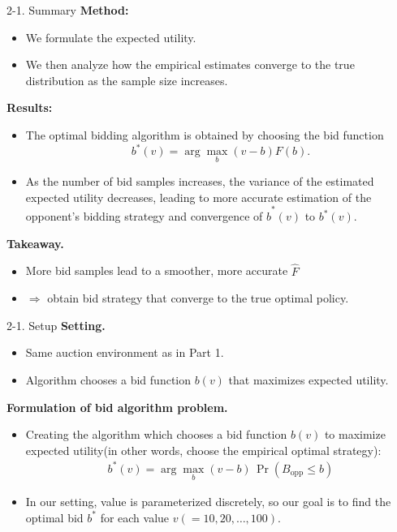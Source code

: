 \documentclass{beamer}
\begin{document}
\begin{frame}{2-1. Summary}
\small
\textbf{Method:}
\begin{itemize}
    \item We formulate the expected utility.
    \item We then analyze how the empirical estimates converge to the true distribution as the sample size increases.
\end{itemize}
\vspace{1em}
\textbf{Results:}
\begin{itemize}
    \item The optimal bidding algorithm is obtained by choosing the bid function
    \[
    b^*(v) = \arg\max_{b}(v-b)F(b).
    \]
    \item As the number of bid samples increases, the variance of the estimated expected utility decreases,
    leading to more accurate estimation of the opponent’s bidding strategy and convergence of $\hat b^*(v)$ to $b^*(v)$.
\end{itemize}
\vspace{1em}
\textbf{Takeaway.}\\
\begin{itemize}
    \item More bid samples lead to a smoother, more accurate $\hat F$\\
    \item $\Rightarrow$ obtain bid strategy that converge to the true optimal policy.
\end{itemize}
\end{frame}

\begin{frame}{2-1. Setup}
\small
\textbf{Setting.}
\begin{itemize}
  \item Same auction environment as in Part 1.
  \item Algorithm chooses a bid function $b(v)$ that maximizes expected utility.
\end{itemize}

\vspace{1em}

\textbf{Formulation of bid algorithm problem.}\\
\begin{itemize}
    \item Creating the algorithm which chooses a bid function $b(v)$ to maximize expected utility(in other words, choose the empirical optimal strategy):
    \begin{align*}
    b^*(v) = \arg\max_b (v-b)\,\Pr(B_{\text{opp}}\le b)
    \end{align*}
    \item In our setting, value is parameterized discretely, so our goal is to find the optimal bid $b^*$ for each value $v (=10, 20, \dots, 100)$.
\end{itemize}
\end{frame}
\end{document}
